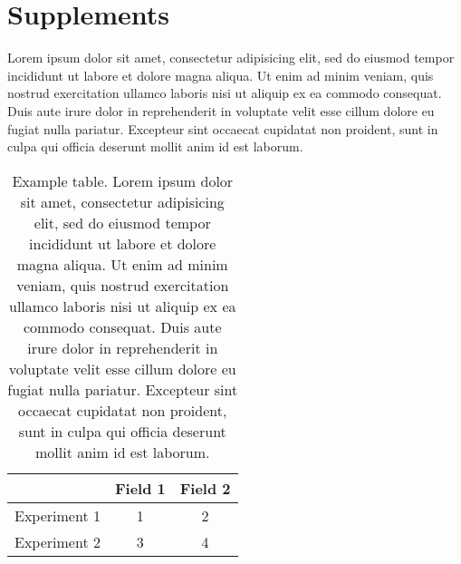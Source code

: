 
\chapter{Supplements}

Lorem ipsum dolor sit amet, consectetur adipisicing elit, sed do eiusmod
tempor incididunt ut labore et dolore magna aliqua. Ut enim ad minim veniam,
quis nostrud exercitation ullamco laboris nisi ut aliquip ex ea commodo
consequat. Duis aute irure dolor in reprehenderit in voluptate velit esse
cillum dolore eu fugiat nulla pariatur. Excepteur sint occaecat cupidatat non
proident, sunt in culpa qui officia deserunt mollit anim id est laborum.

\begin{table}[h]
	\caption[Example table]{Example table. Lorem ipsum dolor sit amet, consectetur adipisicing elit, sed do eiusmod
	tempor incididunt ut labore et dolore magna aliqua. Ut enim ad minim veniam,
	quis nostrud exercitation ullamco laboris nisi ut aliquip ex ea commodo
	consequat. Duis aute irure dolor in reprehenderit in voluptate velit esse
	cillum dolore eu fugiat nulla pariatur. Excepteur sint occaecat cupidatat non
	proident, sunt in culpa qui officia deserunt mollit anim id est laborum.}
	\label{tab:tablename}
	\centering
	\begin{tabular}{lcc}
	\toprule
		& Field 1 & Field 2 \\
	\midrule
	Experiment 1 & 1 & 2 \\
	Experiment 2 & 3 & 4 \\
	\bottomrule
	\end{tabular}
\end{table}